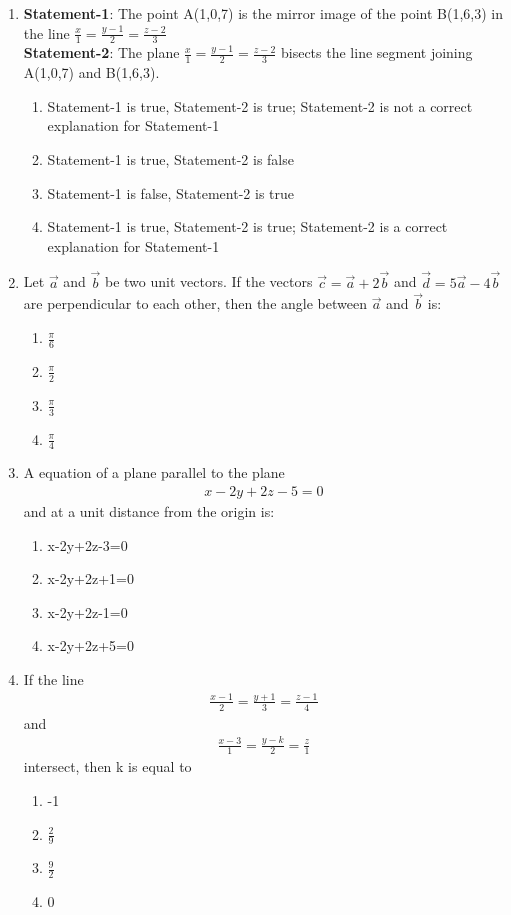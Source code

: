 \begin{enumerate}[label=\arabic*.,ref=\thesubsection.\theenumi]
\item \textbf{Statement-1}: The point A(1,0,7) is the mirror image of the point B(1,6,3) in the line $\frac{x}{1}=\frac{y-1}{2}=\frac{z-2}{3}$\\
\textbf{Statement-2}: The plane $\frac{x}{1}=\frac{y-1}{2}=\frac{z-2}{3}$ bisects the line segment joining A(1,0,7) and B(1,6,3).
\begin{enumerate}
\item Statement-1 is true, Statement-2 is true; Statement-2 is not a correct explanation for Statement-1
\item Statement-1 is true, Statement-2 is false
\item Statement-1 is false, Statement-2 is true
\item Statement-1 is true, Statement-2 is true; Statement-2 is a correct explanation for Statement-1
\end{enumerate}

\item Let $\overrightarrow{a}$ and $\overrightarrow{b}$ be two unit vectors. If the vectors $\overrightarrow{c}=\overrightarrow{a}+2\overrightarrow{b}$ and $\overrightarrow{d}=5\overrightarrow{a}-4\overrightarrow{b}$ are perpendicular to each other, then the angle between $\overrightarrow{a}$ and $\overrightarrow{b}$ is:
\begin{enumerate}
\item $\frac{\pi}{6}$
\item $\frac{\pi}{2}$
\item $\frac{\pi}{3}$
\item $\frac{\pi}{4}$
\end{enumerate}

\item A equation of a plane parallel to the plane 
\begin{align}
x-2y+2z-5=0
\end{align}
and at a unit distance from the origin is:
\begin{enumerate}
\item x-2y+2z-3=0
\item x-2y+2z+1=0
\item x-2y+2z-1=0
\item x-2y+2z+5=0
\end{enumerate}

\item If the line 
\begin{align*}
\frac{x-1}{2}=\frac{y+1}{3}=\frac{z-1}{4}
\end{align*}
and 
\begin{align*}
\frac{x-3}{1}=\frac{y-k}{2}=\frac{z}{1}
\end{align*}
intersect, then k is equal to
\begin{enumerate}
\item -1
\item $\frac{2}{9}$
\item $\frac{9}{2}$
\item 0
\end{enumerate}


\end{enumerate}
